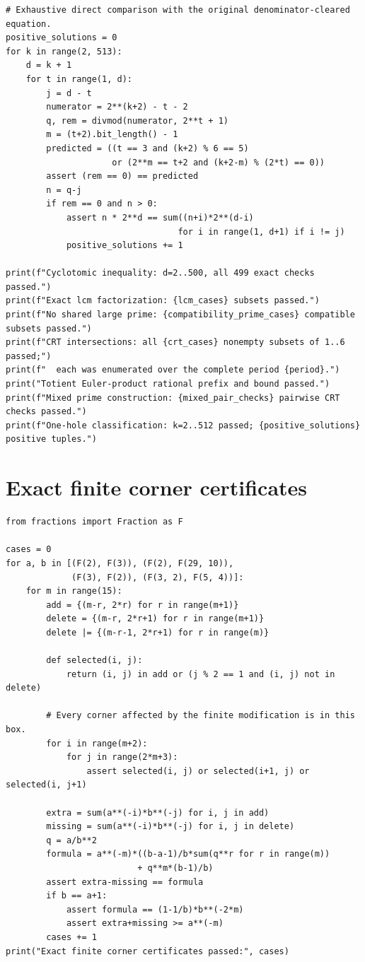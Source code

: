 \documentclass[11pt,a4paper]{article}
\theoremstyle{definition}
\theoremstyle{remark}\newtheorem{remark}[theorem]{Remark}
\begin{document}
\begin{lstlisting}
# Exhaustive direct comparison with the original denominator-cleared equation.
positive_solutions = 0
for k in range(2, 513):
    d = k + 1
    for t in range(1, d):
        j = d - t
        numerator = 2**(k+2) - t - 2
        q, rem = divmod(numerator, 2**t + 1)
        m = (t+2).bit_length() - 1
        predicted = ((t == 3 and (k+2) % 6 == 5)
                     or (2**m == t+2 and (k+2-m) % (2*t) == 0))
        assert (rem == 0) == predicted
        n = q-j
        if rem == 0 and n > 0:
            assert n * 2**d == sum((n+i)*2**(d-i)
                                  for i in range(1, d+1) if i != j)
            positive_solutions += 1

print(f"Cyclotomic inequality: d=2..500, all 499 exact checks passed.")
print(f"Exact lcm factorization: {lcm_cases} subsets passed.")
print(f"No shared large prime: {compatibility_prime_cases} compatible subsets passed.")
print(f"CRT intersections: all {crt_cases} nonempty subsets of 1..6 passed;")
print(f"  each was enumerated over the complete period {period}.")
print("Totient Euler-product rational prefix and bound passed.")
print(f"Mixed prime construction: {mixed_pair_checks} pairwise CRT checks passed.")
print(f"One-hole classification: k=2..512 passed; {positive_solutions} positive tuples.")
\end{lstlisting}

\section{Exact finite corner certificates}

\begin{lstlisting}
from fractions import Fraction as F

cases = 0
for a, b in [(F(2), F(3)), (F(2), F(29, 10)),
             (F(3), F(2)), (F(3, 2), F(5, 4))]:
    for m in range(15):
        add = {(m-r, 2*r) for r in range(m+1)}
        delete = {(m-r, 2*r+1) for r in range(m+1)}
        delete |= {(m-r-1, 2*r+1) for r in range(m)}

        def selected(i, j):
            return (i, j) in add or (j % 2 == 1 and (i, j) not in delete)

        # Every corner affected by the finite modification is in this box.
        for i in range(m+2):
            for j in range(2*m+3):
                assert selected(i, j) or selected(i+1, j) or selected(i, j+1)

        extra = sum(a**(-i)*b**(-j) for i, j in add)
        missing = sum(a**(-i)*b**(-j) for i, j in delete)
        q = a/b**2
        formula = a**(-m)*((b-a-1)/b*sum(q**r for r in range(m))
                          + q**m*(b-1)/b)
        assert extra-missing == formula
        if b == a+1:
            assert formula == (1-1/b)*b**(-2*m)
            assert extra+missing >= a**(-m)
        cases += 1
print("Exact finite corner certificates passed:", cases)
\end{lstlisting}
\end{document}
